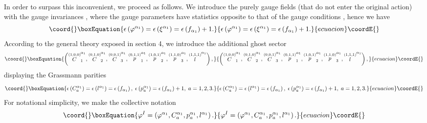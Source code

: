 \documentclass[a4paper,12pt]{article}
\begin{document}
In order to surpass this inconvenient, we proceed as follows. We introduce
the purely gauge fields \coordHE{} (that do not enter the
original action) with the gauge invariances \coordHE{}, where the gauge parameters \coordHE{}
have statistics opposite to that of the gauge conditions \coordHE{}, hence we have 
\begin{equation}\coord{}\boxEquation{
\epsilon \left( \varphi ^{\alpha _{1}}\right) =\epsilon \left( \xi ^{\alpha
_{1}}\right) =\epsilon \left( f_{\alpha _{1}}\right) +1.  \label{sp3.119}
}{
\epsilon \left( \varphi ^{\alpha _{1}}\right) =\epsilon \left( \xi ^{\alpha
_{1}}\right) =\epsilon \left( f_{\alpha _{1}}\right) +1.  }{ecuacion}\coordE{}\end{equation}
According to the general theory exposed in section 4, we introduce the
additional ghost sector 
\begin{equation}\coord{}\boxEquation{
\left( \stackrel{(1,0,0)}{C}_{1}^{\alpha _{1}},\stackrel{(0,1,0)}{C}
_{2}^{\alpha _{1}},\stackrel{(0,0,1)}{C}_{3}^{\alpha _{1}},\stackrel{(0,1,1)
}{p}_{1}^{\alpha _{1}},\stackrel{(1,0,1)}{p}_{2}^{\alpha _{1}},\stackrel{
(1,1,0)}{p}_{3}^{\alpha _{1}},\stackrel{(1,1,1)}{l}^{\alpha _{1}}\right) ,
\label{sp3.120}
}{
\left( \stackrel{(1,0,0)}{C}_{1}^{\alpha _{1}},\stackrel{(0,1,0)}{C}
_{2}^{\alpha _{1}},\stackrel{(0,0,1)}{C}_{3}^{\alpha _{1}},\stackrel{(0,1,1)
}{p}_{1}^{\alpha _{1}},\stackrel{(1,0,1)}{p}_{2}^{\alpha _{1}},\stackrel{
(1,1,0)}{p}_{3}^{\alpha _{1}},\stackrel{(1,1,1)}{l}^{\alpha _{1}}\right) ,
}{ecuacion}\coordE{}\end{equation}
displaying the Grassmann parities 
\begin{equation}\coord{}\boxEquation{
\epsilon \left( C_{a}^{\alpha _{1}}\right) =\epsilon \left( l^{\alpha
_{1}}\right) =\epsilon \left( f_{\alpha _{1}}\right) ,\;\epsilon \left(
p_{a}^{\alpha _{1}}\right) =\epsilon \left( f_{\alpha _{1}}\right)
+1,\;a=1,2,3.  \label{sp3.121}
}{
\epsilon \left( C_{a}^{\alpha _{1}}\right) =\epsilon \left( l^{\alpha
_{1}}\right) =\epsilon \left( f_{\alpha _{1}}\right) ,\;\epsilon \left(
p_{a}^{\alpha _{1}}\right) =\epsilon \left( f_{\alpha _{1}}\right)
+1,\;a=1,2,3.  }{ecuacion}\coordE{}\end{equation}
For notational simplicity, we make the collective notation 
\begin{equation}\coord{}\boxEquation{
\varphi ^{I}=\left( \varphi ^{\alpha _{1}},C_{a}^{\alpha _{1}},p_{a}^{\alpha
_{1}},l^{\alpha _{1}}\right) .  \label{sp3.122}
}{
\varphi ^{I}=\left( \varphi ^{\alpha _{1}},C_{a}^{\alpha _{1}},p_{a}^{\alpha
_{1}},l^{\alpha _{1}}\right) .  }{ecuacion}\coordE{}\end{equation}
\end{document}
